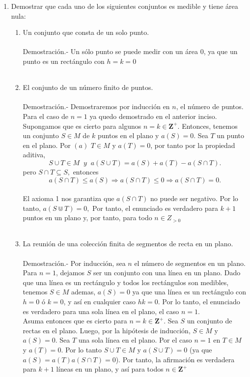     \begin{enumerate}

	\item Demostrar que cada uno de los siguientes conjuntos es medible y tiene área nula:

	    \begin{enumerate}[\bfseries (a)]

	    \item Un conjunto que consta de un solo punto.\\\\
	    Demostración.-\; Un sólo punto se puede medir con un área $0$, ya que un punto es un rectángulo con $h=k=0$\\\\

	    \item El conjunto de un número finito de puntos.\\\\
		Demostración.-\; Demostraremos por inducción en $n$, el número de puntos. Para el caso de $n=1$ ya quedo demostrado en el anterior inciso. Supongamos que es cierto para algunos $n=k\in \mathbf{Z}^+$. Entonces, tenemos un conjunto $S \in M$ de $k$ puntos en el plano y $a(S)=0$. Sea $T$ un punto en el plano. Por $(a)$ $T \in M$ y $a(T)=0$, por tanto por la propiedad aditiva, $$S\cup T \in M \;\; y \;\; a(S\cup T)=a(S)+a(T) - a(S\cap T).$$ pero $S\cap T \subseteq S,$ entonces $$a(S \cap T)\leq a(S) \Rightarrow a(S \cap T)\leq 0 \Rightarrow a(S \cap T)=0.$$\\ El axioma 1 nos garantiza que $a(S \cap T)$ no puede ser negativo. Por lo tanto, $a(S \Cup T)=0,$ Por tanto, el enunciado es verdadero para $k+1$ puntos en un plano y, por tanto, para todo $n \in Z_{>0}$\\\\

	    \item La reunión de una colección finita de segmentos de recta en un plano.\\\\
	    Demostración.-\; Por inducción, sea $n$ el número de segmentos en un plano. Para $n=1$, dejamos $S$ ser un conjunto con una línea en un plano. Dado que una línea es un rectángulo y todos los rectángulos son medibles, tenemos $S\in M$ ademas, $a(S)=0$ ya que una línea es un rectángulo con $h=0$ ó $k=0$, y así en cualquier caso $hk=0$. Por lo tanto, el enunciado es verdadero para una sola línea en el plano, el caso $n=1$.\\
		    Asuma entonces que es cierto para $n=k \in \mathbf{Z}^+$. Sea $S$ un conjunto de rectas en el plano. Luego, por la hipótesis de inducción, $S\in M$ y $a(S)=0$. Sea $T$ una sola línea en el plano. Por el caso $n=1$ en $T\in M$ y $a(T)=0$. Por lo tanto $S\cup T \in M$ y $a(S\cup T)=0$ (ya que $a(S)=a(T)a(S\cap T)=0$). Por tanto, la afirmación es verdadera para $k+1$ líneas en un plano, y así para todos $n\in \mathbf{Z}^+$\\\\


\end{enumerate}
\end{enumerate}

